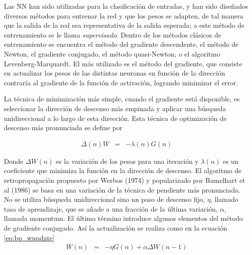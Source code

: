 Las NN han sido utilizadas para la clasificación de entradas, y han sido diseñados diversos métodos para entrenar la red y que los pesos se adapten, de tal manera que la salida de la red sea representativa de la salida esperada; a este método de entrenamiento se le llama {\em supervisado}. Dentro de los métodos clásicos de entrenamiento se encuentra el método del gradiente descendente, el método de Newton, el gradiente conjugado, el método quasi-Newton, o el algoritmo Levenberg-Marquardt. El más utilizado es el método del gradiente, que consiste en actualizar los pesos de las distintas neuronas en función de la dirección contraría al gradiente de la función de activación, logrando minimizar el error.

La técnica de minimización más simple, cuando el gradiente está disponible, es seleccionar la dirección de descenso más empinada y aplicar una búsqueda unidireccional a lo largo de esta dirección. Esta técnica de optimización de descenso más pronunciada se define por

\begin{eqnarray}
	\Delta(n) W &=& -\lambda(n)G(n)
\end{eqnarray}

Donde $\Delta W(n)$ es la variación de los pesos para una iteración y $\lambda(n)$ es un coeficiente que minimiza la función en la dirección de descenso. %
El algoritmo de retropropagación propuesto por Werbos (1974) y popularizado por Rumelhart et al (1986) se basa en una variación de la técnica de pendiente más pronunciada. No se utiliza búsqueda unidireccional sino un paso de descenso fijo, $\eta$, llamado tasa de aprendizaje, que se añade a una fracción de la última variación, $\alpha$, llamada momentum. El último término introduce algunos elementos del método de gradiente conjugado. %
%
Así la actualización se realiza como en la ecuación \ref{eq:bp_wupdate}
\begin{eqnarray}
	W(n) &=& -\eta G(n) + \alpha\Delta W(n - 1)\label{eq:bp_wupdate}
\end{eqnarray}

